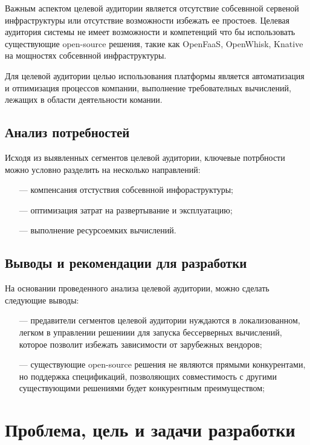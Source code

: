 Важным аспектом целевой аудитории является отсутствие собсевнной сервеной инфраструктуры или отсутствие возможности избежать ее простоев. Целевая аудитория системы не имеет возможности и компетенций что бы использовать существующие open-source\cite{fitzgerald2006transformation} решения, такие как OpenFaaS, OpenWhisk, Knative на мощностях собсевнной инфраструктуры.

Для целевой аудитории целью использования платформы является автоматизация и отпимизация процессов компании, выполнение требователных вычислений, лежащих в области деятельности комании.

\subsection{Анализ потребностей}

Исходя из выявленных сегментов целевой аудитории, ключевые потрбности можно условно разделить на несколько направлений:
\begin{itemize}
    \item[---]компенсания отстуствия собсевнной инфораструктуры;
    \item[---]оптимизация затрат на развертывание и эксплуатацию;
    \item[---]выполнение ресурсоемких вычислений.
\end{itemize}

\subsection{Выводы и рекомендации для разработки}

На основании проведенного анализа целевой аудитории, можно сделать следующие выводы:

\begin{itemize}
    \item[---]предавители сегментов целевой аудитории нуждаются в локализованном, легком в управлении решениии для запуска бессерверных вычислений, которое позволит избежать зависимости от зарубежных вендоров;
    \item[---]существующие open-source решения не являются прямыми конкурентами, но поддержка спецификаций, позволяющих совместимость с другими существующими решениями будет конкурентным преимуществом;
\end{itemize}

\section{Проблема, цель и задачи разработки}


